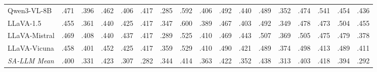 \begin{table}[t]
\begin{tabular}{lcccccccccccccccc}
\quad Qwen3-VL-8B & \cellcolor[HTML]{D9EAF3}.471 & \cellcolor[HTML]{D9EAF3}.396 & \cellcolor[HTML]{D9EAF3}.462 & \cellcolor[HTML]{D9EAF3}.406 & \cellcolor[HTML]{D9EAF3}.417 & \cellcolor[HTML]{D9EAF3}.285 & \cellcolor[HTML]{D9EAF3}.592 & \cellcolor[HTML]{D9EAF3}.406 & \cellcolor[HTML]{D9EAF3}.492 & \cellcolor[HTML]{D9EAF3}.440 & \cellcolor[HTML]{D9EAF3}.489 & \cellcolor[HTML]{D9EAF3}.352 & \cellcolor[HTML]{D9EAF3}.474 & \cellcolor[HTML]{D9EAF3}.541 & \cellcolor[HTML]{D9EAF3}.454 & \cellcolor[HTML]{D9EAF3}.436 \\
\quad LLaVA-1.5 & \cellcolor[HTML]{D9EAF3}.455 & \cellcolor[HTML]{D9EAF3}.361 & \cellcolor[HTML]{D9EAF3}.440 & \cellcolor[HTML]{D9EAF3}.425 & \cellcolor[HTML]{D9EAF3}.417 & \cellcolor[HTML]{D9EAF3}.347 & \cellcolor[HTML]{D9EAF3}.600 & \cellcolor[HTML]{D9EAF3}.389 & \cellcolor[HTML]{D9EAF3}.467 & \cellcolor[HTML]{D9EAF3}.403 & \cellcolor[HTML]{D9EAF3}.492 & \cellcolor[HTML]{D9EAF3}.349 & \cellcolor[HTML]{D9EAF3}.478 & \cellcolor[HTML]{D9EAF3}.473 & \cellcolor[HTML]{D9EAF3}.504 & \cellcolor[HTML]{D9EAF3}.455 \\
\quad LLaVA-Mistral & \cellcolor[HTML]{D9EAF3}.469 & \cellcolor[HTML]{D9EAF3}.408 & \cellcolor[HTML]{D9EAF3}.440 & \cellcolor[HTML]{FFCCCC}.437 & \cellcolor[HTML]{D9EAF3}.417 & \cellcolor[HTML]{D9EAF3}.289 & \cellcolor[HTML]{D9EAF3}.525 & \cellcolor[HTML]{D9EAF3}.410 & \cellcolor[HTML]{D9EAF3}.469 & \cellcolor[HTML]{D9EAF3}.443 & \cellcolor[HTML]{D9EAF3}.507 & \cellcolor[HTML]{D9EAF3}.369 & \cellcolor[HTML]{D9EAF3}.505 & \cellcolor[HTML]{D9EAF3}.475 & \cellcolor[HTML]{D9EAF3}.479 & \cellcolor[HTML]{D9EAF3}.378 \\
\quad LLaVA-Vicuna & \cellcolor[HTML]{D9EAF3}.458 & \cellcolor[HTML]{D9EAF3}.401 & \cellcolor[HTML]{D9EAF3}.452 & \cellcolor[HTML]{D9EAF3}.425 & \cellcolor[HTML]{D9EAF3}.417 & \cellcolor[HTML]{D9EAF3}.359 & \cellcolor[HTML]{D9EAF3}.529 & \cellcolor[HTML]{D9EAF3}.410 & \cellcolor[HTML]{D9EAF3}.490 & \cellcolor[HTML]{D9EAF3}.421 & \cellcolor[HTML]{D9EAF3}.489 & \cellcolor[HTML]{D9EAF3}.374 & \cellcolor[HTML]{D9EAF3}.498 & \cellcolor[HTML]{D9EAF3}.413 & \cellcolor[HTML]{D9EAF3}.489 & \cellcolor[HTML]{D9EAF3}.411 \\
\midrule
\rowcolor{gray!12}\textit{SA-LLM Mean} & \cellcolor[HTML]{F7EBD9}.400 & \cellcolor[HTML]{F7EBD9}.331 & \cellcolor[HTML]{D9EAF3}.423 & \cellcolor[HTML]{D9EAF3}.307 & \cellcolor[HTML]{D9EAF3}.282 & \cellcolor[HTML]{D9EAF3}.344 & \cellcolor[HTML]{F7EBD9}.414 & \cellcolor[HTML]{D9EAF3}.363 & \cellcolor[HTML]{D9EAF3}.422 & \cellcolor[HTML]{F7EBD9}.352 & \cellcolor[HTML]{D9EAF3}.438 & \cellcolor[HTML]{D9EAF3}.313 & \cellcolor[HTML]{D9EAF3}.403 & \cellcolor[HTML]{D9EAF3}.418 & \cellcolor[HTML]{D9EAF3}.394 & \cellcolor[HTML]{F7EBD9}.292 \\

\end{tabular}
\end{table}
